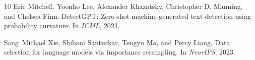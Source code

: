 \documentclass[letterpaper]{article}
\begin{document}
\begin{thebibliography}{10}
Eric Mitchell, Yoonho Lee, Alexander Khazatsky, Christopher D. Manning, and Chelsea Finn.
\newblock DetectGPT: Zero-shot machine-generated text detection using probability curvature.
\newblock In \emph{ICML}, 2023.

Sang~Michael Xie, Shibani Santurkar, Tengyu Ma, and Percy Liang.
\newblock Data selection for language models via importance resampling.
\newblock In \emph{NeurIPS}, 2023.

\end{thebibliography}
\end{document}
